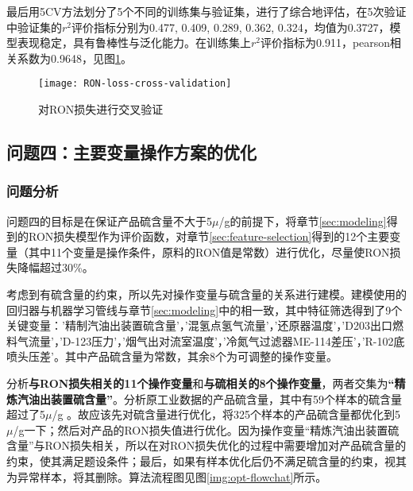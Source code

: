 \documentclass[bwprint]{gmcmthesis}
\begin{document}
最后用5CV方法划分了5个不同的训练集与验证集，进行了综合地评估，在5次验证中验证集的$r^2$评价指标分别为0.477, 0.409, 0.289, 0.362, 0.324，均值为0.3727，模型表现稳定，具有鲁棒性与泛化能力。在训练集上$r^2$评价指标为0.911，pearson相关系数为0.9648，见图\ref{RON-loss-cv}。

\begin{figure}[htb]
	\centering
	\texttt{[image: RON-loss-cross-validation]}
	\caption{对RON损失进行交叉验证}
	\label{RON-loss-cv}
\end{figure}



\FloatBarrier
\subsection{问题四：主要变量操作方案的优化}

\FloatBarrier
\subsubsection{问题分析}\label{sec:opt-problem-analyze}



问题四的目标是在保证产品硫含量不大于5$\mu$/g的前提下，将章节\ref{sec:modeling}得到的RON损失模型作为评价函数，对章节\ref{sec:feature-selection}得到的12个主要变量（其中11个变量是操作条件，原料的RON值是常数）进行优化，尽量使RON损失降幅超过30\%。


考虑到有硫含量的约束，所以先对操作变量与硫含量的关系进行建模。建模使用的回归器与机器学习管线与章节\ref{sec:modeling}中的相一致，其中特征筛选得到了9个关键变量：'精制汽油出装置硫含量'，'混氢点氢气流量'，'还原器温度'，'D203出口燃料气流量'，'D-123压力'，'烟气出对流室温度'，'冷氮气过滤器ME-114差压'，'R-102底喷头压差'。其中产品硫含量为常数，其余8个为可调整的操作变量。

分析\textbf{与RON损失相关的11个操作变量}和\textbf{与硫相关的8个操作变量}，两者交集为\textbf{“精炼汽油出装置硫含量”}。分析原工业数据的产品硫含量，其中有59个样本的硫含量超过了5$\mu$/g 。故应该先对硫含量进行优化，将325个样本的产品硫含量都优化到5$\mu$/g一下；然后对产品的RON损失值进行优化。因为操作变量“精炼汽油出装置硫含量”与RON损失相关，所以在对RON损失优化的过程中需要增加对产品硫含量的约束，使其满足题设条件；最后，如果有样本优化后仍不满足硫含量的约束，视其为异常样本，将其删除。算法流程图见图\ref{img:opt-flowchat}所示。
\end{document}
